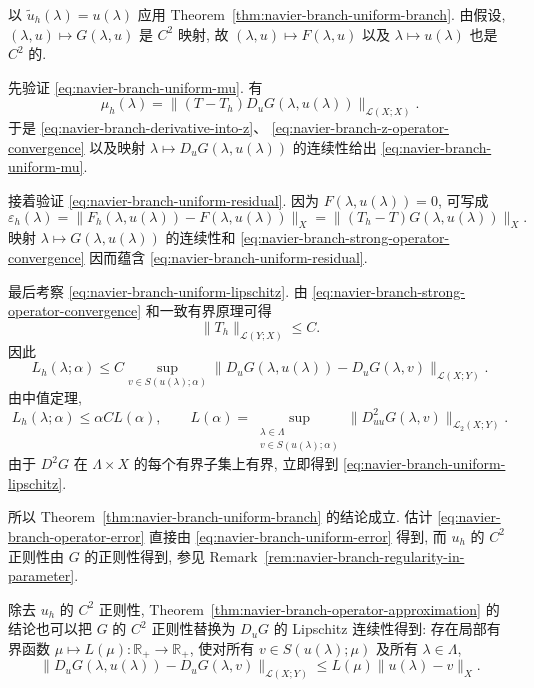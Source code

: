 \begin{Proof}
以 $\widetilde u_h(\lambda)=u(\lambda)$ 应用
Theorem~\ref{thm:navier-branch-uniform-branch}. 由假设,
$(\lambda,u)\mapsto G(\lambda,u)$ 是 $C^2$ 映射, 故
$(\lambda,u)\mapsto F(\lambda,u)$ 以及 $\lambda\mapsto u(\lambda)$ 也是 $C^2$ 的.

先验证 \eqref{eq:navier-branch-uniform-mu}. 有
\[
\mu_h(\lambda)=
\|(T-T_h)D_uG(\lambda,u(\lambda))\|_{\mathcal L(X;X)}.
\]
于是 \eqref{eq:navier-branch-derivative-into-z}、
\eqref{eq:navier-branch-z-operator-convergence} 以及映射
$\lambda\mapsto D_uG(\lambda,u(\lambda))$ 的连续性给出
\eqref{eq:navier-branch-uniform-mu}.

接着验证 \eqref{eq:navier-branch-uniform-residual}. 因为
$F(\lambda,u(\lambda))=0$, 可写成
\[
\varepsilon_h(\lambda)
=\|F_h(\lambda,u(\lambda))-F(\lambda,u(\lambda))\|_X
=\|(T_h-T)G(\lambda,u(\lambda))\|_X.
\]
映射 $\lambda\mapsto G(\lambda,u(\lambda))$ 的连续性和
\eqref{eq:navier-branch-strong-operator-convergence} 因而蕴含
\eqref{eq:navier-branch-uniform-residual}.

最后考察 \eqref{eq:navier-branch-uniform-lipschitz}. 由
\eqref{eq:navier-branch-strong-operator-convergence} 和一致有界原理可得
\[
\|T_h\|_{\mathcal L(Y;X)}\leq C.
\]
因此
\[
L_h(\lambda;\alpha)
\leq C\sup_{v\in S(u(\lambda);\alpha)}
\|D_uG(\lambda,u(\lambda))-D_uG(\lambda,v)\|_{\mathcal L(X;Y)}.
\]
由中值定理,
\[
L_h(\lambda;\alpha)\leq\alpha C L(\alpha),
\qquad
L(\alpha)=
\sup_{\substack{\lambda\in\Lambda\\v\in S(u(\lambda);\alpha)}}
\|D_{uu}^2G(\lambda,v)\|_{\mathcal L_2(X;Y)}.
\]
由于 $D^2G$ 在 $\Lambda\times X$ 的每个有界子集上有界,
立即得到 \eqref{eq:navier-branch-uniform-lipschitz}.

所以 Theorem~\ref{thm:navier-branch-uniform-branch} 的结论成立.
估计 \eqref{eq:navier-branch-operator-error} 直接由
\eqref{eq:navier-branch-uniform-error} 得到, 而 $u_h$ 的 $C^2$ 正则性由
$G$ 的正则性得到, 参见 Remark~\ref{rem:navier-branch-regularity-in-parameter}.
\end{Proof}

\setcounter{statement}{4}
\begin{Remark}\label{rem:navier-branch-lipschitz-derivative}
除去 $u_h$ 的 $C^2$ 正则性, Theorem~\ref{thm:navier-branch-operator-approximation}
的结论也可以把 $G$ 的 $C^2$ 正则性替换为 $D_uG$ 的 Lipschitz 连续性得到:
存在局部有界函数 $\mu\mapsto L(\mu):\mathbb R_+\to\mathbb R_+$, 使对所有
$v\in S(u(\lambda);\mu)$ 及所有 $\lambda\in\Lambda$,
\begin{equation}\label{eq:navier-branch-local-lipschitz-derivative}
\|D_uG(\lambda,u(\lambda))-D_uG(\lambda,v)\|_{\mathcal L(X;Y)}
\leq L(\mu)\|u(\lambda)-v\|_X.
\end{equation}
\end{Remark}

